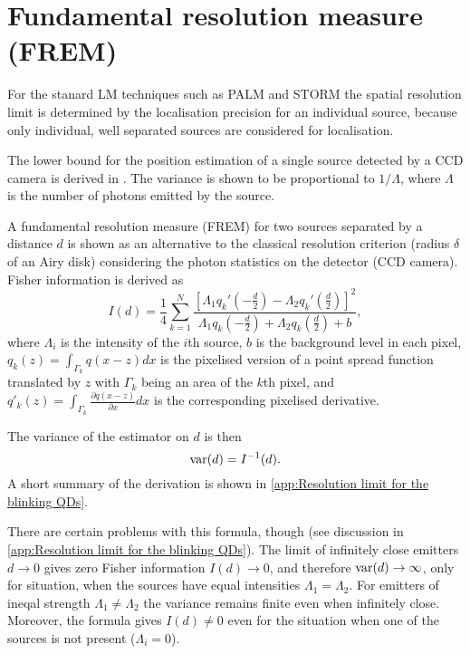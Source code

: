
\section{Fundamental resolution measure (FREM)}

For the stanard LM techniques such as PALM and STORM  the spatial resolution limit is determined by the localisation precision for an individual source, because only individual, well separated sources are considered for localisation. 

The \CR lower bound for the position estimation of a single source detected by a CCD camera is derived in \cite{Ram2006,Ram2006b}. The variance is shown to be proportional to $1/\Lambda$, where $\Lambda$ is the number of photons emitted by the source. 

A fundamental resolution measure (FREM) for two sources separated by a distance $d$ is shown as an alternative to the classical resolution criterion (radius $\delta$ of an Airy disk) considering the photon statistics on the detector (CCD camera). Fisher information is derived as
%
\begin{equation}
	I(d)=\frac{1}{4}\sum_{k=1}^N\frac{\left[\Lambda_1q_k'(-\frac{d}{2})-\Lambda_2q_k'(\frac{d}{2})\right]^2}{\Lambda_1q_k(-\frac{d}{2})+\Lambda_2q_k(\frac{d}{2})+b},
	\label{eq:Ram FREM}
\end{equation}
%
where $\Lambda_i$ is the intensity of the $i$th source, $b$ is the background level in each pixel, $q_k(z)=\int_{\Gamma_k}q(x-z)dx$ is the pixelised version of a point spread function translated by $z$ with $\Gamma_k$ being an area of the $k$th pixel, and $q'_k(z)=\int_{\Gamma_k}\frac{\partial q(x-z)}{\partial x}dx$ is the corresponding pixelised derivative. 

The variance of the estimator on $d$ is then 
%
\begin{equation}
	\mathrm{var}(d)=I^{-1}(d).
\end{equation}
%
A short summary of the derivation is shown in \autoref{app:Resolution limit for the blinking QDs}. 

There are certain problems with this formula, though (see discussion in \autoref{app:Resolution limit for the blinking QDs}). The limit of infinitely close emitters $d\rightarrow0$ gives  zero Fisher information $I(d)\rightarrow0$, and therefore $\mathrm{var}(d)\rightarrow\infty$, only for situation, when the sources have equal intensities $\Lambda_1=\Lambda_2$. For emitters of ineqal strength $\Lambda_1\neq\Lambda_2$ the variance remains finite even when infinitely close. Moreover, the formula gives $I(d)\neq0$ even for the situation when one of the sources is not present ($\Lambda_i=0$).

